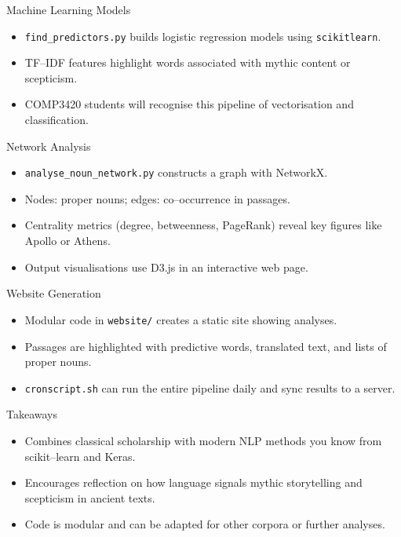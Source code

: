 \documentclass{beamer}
\begin{document}
\begin{frame}{Machine Learning Models}
  \begin{itemize}
    \item \texttt{find\_predictors.py} builds logistic regression models using \texttt{scikit\-learn}.
    \item TF--IDF features highlight words associated with mythic content or scepticism.
    \item COMP3420 students will recognise this pipeline of vectorisation and classification.
  \end{itemize}
\end{frame}

\begin{frame}{Network Analysis}
  \begin{itemize}
    \item \texttt{analyse\_noun\_network.py} constructs a graph with NetworkX.
    \item Nodes: proper nouns; edges: co--occurrence in passages.
    \item Centrality metrics (degree, betweenness, PageRank) reveal key figures like Apollo or Athens.
    \item Output visualisations use D3.js in an interactive web page.
  \end{itemize}
\end{frame}

\begin{frame}{Website Generation}
  \begin{itemize}
    \item Modular code in \texttt{website/} creates a static site showing analyses.
    \item Passages are highlighted with predictive words, translated text, and lists of proper nouns.
    \item \texttt{cronscript.sh} can run the entire pipeline daily and sync results to a server.
  \end{itemize}
\end{frame}

\begin{frame}{Takeaways}
  \begin{itemize}
    \item Combines classical scholarship with modern NLP methods you know from scikit--learn and Keras.
    \item Encourages reflection on how language signals mythic storytelling and scepticism in ancient texts.
    \item Code is modular and can be adapted for other corpora or further analyses.
  \end{itemize}
\end{frame}
\end{document}
